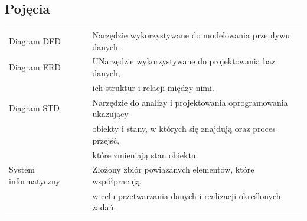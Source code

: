 \documentclass[12pt]{article}
\begin{document}
\subsection*{Pojęcia}
\begin{table}[!ht]
    \centering
    \begin{tabularx}{1.01\textwidth}{ll}
        \toprule
        Diagram DFD           & Narzędzie wykorzystywane do modelowania przepływu danych.  \\
        Diagram ERD                       & UNarzędzie wykorzystywane do projektowania baz danych, \\
         & ich struktur i relacji między nimi.\\
        Diagram STD            & Narzędzie do analizy i projektowania oprogramowania ukazujący \\
         & obiekty i stany, w których się znajdują oraz proces przejść, \\
         & które zmieniają stan obiektu.  \\
        System informatyczny        & Złożony zbiór powiązanych elementów, które współpracują \\
        & w celu przetwarzania danych i realizacji określonych zadań. \\
        \bottomrule
    \end{tabularx}
\end{table}
\end{document}
